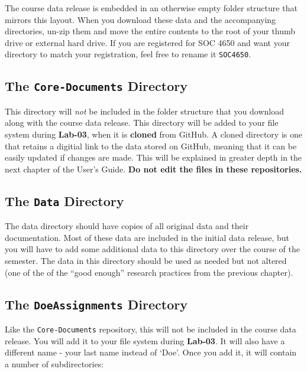 \documentclass[]{book}
\begin{document}
The course data release is embedded in an otherwise empty folder
structure that mirrors this layout. When you download these data and the
accompanying directories, un-zip them and move the entire contents to
the root of your thumb drive or external hard drive. If you are
registered for SOC 4650 and want your directory to match your
registration, feel free to rename it \texttt{SOC4650}.

\subsection{\texorpdfstring{The \texttt{Core-Documents}
Directory}{The Core-Documents Directory}}\label{the-core-documents-directory}

This directory will \emph{not} be included in the folder structure that
you download along with the course data release. This directory will be
added to your file system during \textbf{Lab-03}, when it is
\textbf{cloned} from GitHub. A cloned directory is one that retains a
digitial link to the data stored on GitHub, meaning that it can be
easily updated if changes are made. This will be explained in greater
depth in the next chapter of the User's Guide. \textbf{Do not edit the
files in these repositories.}

\subsection{\texorpdfstring{The \texttt{Data}
Directory}{The Data Directory}}\label{the-data-directory}

The data directory should have copies of all original data and their
documentation. Most of these data are included in the initial data
release, but you will have to add some additional data to this directory
over the course of the semester. The data in this directory should be
used as needed but not altered (one of the of the ``good enough''
research practices from the previous chapter).

\subsection{\texorpdfstring{The \texttt{DoeAssignments}
Directory}{The DoeAssignments Directory}}\label{the-doeassignments-directory}

Like the \texttt{Core-Documents} repository, this will not be included
in the course data release. You will add it to your file system during
\textbf{Lab-03}. It will also have a different name - your last name
instead of `Doe'. Once you add it, it will contain a number of
subdirectories:
\end{document}
